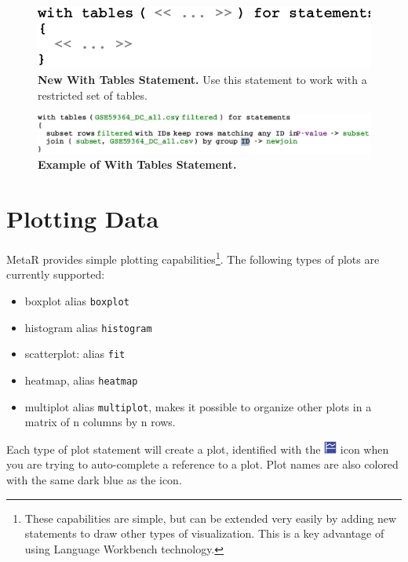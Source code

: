 \begin{figure}
  \centering
  \includegraphics[width=\figWidthNarrow]{figures/NewWithTablesStatement.pdf}
\caption[New With Tables Statement.]{\textbf{New With Tables Statement.} Use this statement to work with a restricted set of tables.}
\label{fig:NewWithTablesStatement}
\end{figure}

 \begin{figure}
  \centering
  \includegraphics[width=\figWidthWide]{figures/ExampleWithTablesStatement.pdf}
\caption[Example of With Tables Statement.]{\textbf{Example of With Tables Statement.}}
\label{fig:ExampleWithTablesStatement}
\end{figure}

\section{Plotting Data}
MetaR provides simple plotting capabilities\footnote{These capabilities are simple, but can be extended very easily by adding new statements to draw other types of visualization. This is a key advantage of using Language Workbench technology.}. The following types of plots are currently supported: 
\begin{itemize}
  \item boxplot alias \texttt{boxplot}
  \item histogram alias \texttt{histogram}
  \item scatterplot: alias \texttt{fit}
  \item heatmap, alias \texttt{heatmap}
  \item multiplot alias \texttt{multiplot}, makes it possible to organize other plots in a matrix of n columns by n rows.
\end{itemize}
Each type of plot statement will create a plot, identified with the \includegraphics[height=2ex]{figures/plot.png} icon when you are trying to auto-complete a reference to a plot. Plot names are also colored with the same dark blue as the icon.

